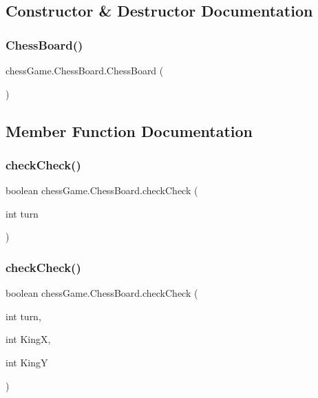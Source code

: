 \subsection{Constructor \& Destructor Documentation}
\hypertarget{classchess_game_1_1_chess_board_a5c11ece644fcc726a8ab56bbfb468c0f}{}\label{classchess_game_1_1_chess_board_a5c11ece644fcc726a8ab56bbfb468c0f} 
\subsubsection{\texorpdfstring{Chess\+Board()}{ChessBoard()}}
{\footnotesize\ttfamily chess\+Game.\+Chess\+Board.\+Chess\+Board (\begin{DoxyParamCaption}{ }\end{DoxyParamCaption})}



\subsection{Member Function Documentation}
\hypertarget{classchess_game_1_1_chess_board_a082e7ad980f8591576dafcedbcf284ec}{}\label{classchess_game_1_1_chess_board_a082e7ad980f8591576dafcedbcf284ec} 
\subsubsection{\texorpdfstring{check\+Check()}{checkCheck()}\hspace{0.1cm}{\footnotesize\ttfamily [1/2]}}
{\footnotesize\ttfamily boolean chess\+Game.\+Chess\+Board.\+check\+Check (\begin{DoxyParamCaption}\item[{int}]{turn }\end{DoxyParamCaption})}

\hypertarget{classchess_game_1_1_chess_board_a99b81fc49623a944c30e377e97e2d037}{}\label{classchess_game_1_1_chess_board_a99b81fc49623a944c30e377e97e2d037} 
\subsubsection{\texorpdfstring{check\+Check()}{checkCheck()}\hspace{0.1cm}{\footnotesize\ttfamily [2/2]}}
{\footnotesize\ttfamily boolean chess\+Game.\+Chess\+Board.\+check\+Check (\begin{DoxyParamCaption}\item[{int}]{turn,  }\item[{int}]{KingX,  }\item[{int}]{KingY }\end{DoxyParamCaption})}

